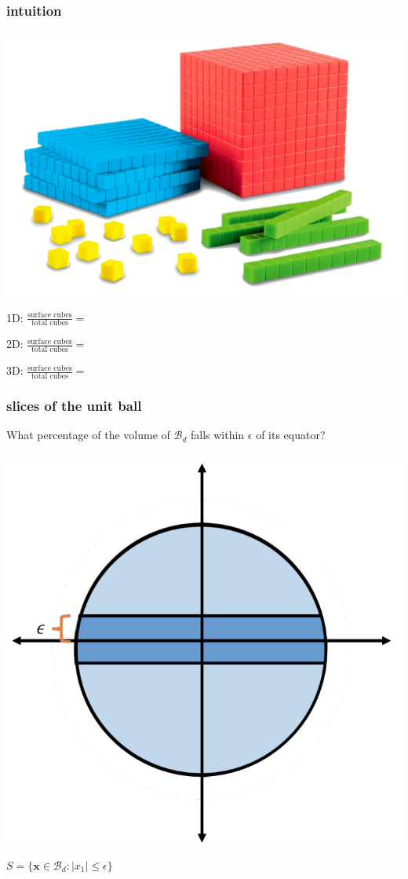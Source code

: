 \documentclass[compress]{beamer}
\newcommand{\bv}[1]{\mathbf{#1}}
\begin{document}
\begin{frame}[t]
	\frametitle{intuition}
	\begin{center}
		\includegraphics[width=.6\textwidth]{base10.png}
	\end{center}
	\vspace{-1em}
	1D: $\frac{\text{surface cubes}}{\text{total cubes}} = $
	\vspace{1em}

	2D: $\frac{\text{surface cubes}}{\text{total cubes}} = $
	\vspace{1em}
	
	3D: $\frac{\text{surface cubes}}{\text{total cubes}} = $
\end{frame}

\begin{frame}[t]
	\frametitle{slices of the unit ball}
	\alert{What percentage of the volume of $\mathcal{B}_d$ falls within $\epsilon$ of its equator?} 
	
	\begin{center}
		\includegraphics[width=.5\textwidth]{equator.png}
		
		$S = \{\bv{x}\in \mathcal{B}_d: |x_1|\leq \epsilon\}$
	\end{center}
\end{frame}
\end{document}
